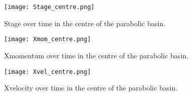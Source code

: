 \begin{figure}[h]
\begin{center}
\texttt{[image: Stage\_centre.png]}
\caption{Stage over time in the centre of the parabolic basin.}
\label{fig:Stage_centre}
\end{center}
\end{figure}

\begin{figure}[h]
\begin{center}
\texttt{[image: Xmom\_centre.png]}
\caption{Xmomentum over time in the centre of the parabolic basin.}
\label{fig:Xmom_centre}
\end{center}
\end{figure}

\begin{figure}[h]
\begin{center}
\texttt{[image: Xvel\_centre.png]}
\caption{Xvelocity over time in the centre of the parabolic basin.}
\label{fig:Xvel_centre}
\end{center}
\end{figure}


\endinput
